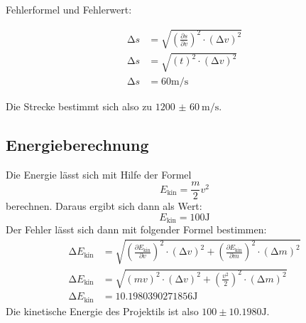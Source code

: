 Fehlerformel und Fehlerwert:

\begin{align*}
    \increment s &= \sqrt{\left(\frac{\partial s}{\partial v }\right)^2 \cdot \left(\increment v \right)^2 }\\
    \increment s &= \sqrt{\left(t\right)^2 \cdot \left(\increment v \right)^2 }\\
    \increment s &= 60 \si{\metre\per\second}
\end{align*}

Die Strecke bestimmt sich also zu $\SI{1200(60)}{\metre\per\second}$.

\subsection{Energieberechnung}

Die Energie lässt sich mit Hilfe der Formel
\begin{equation*}
    E_\text{kin}=\frac{m}{2}v^2
\end{equation*}
berechnen.
Daraus ergibt sich dann als Wert:
\begin{equation*}
    E_\text{kin}=100 \si{\joule}
\end{equation*}
\newline
Der Fehler lässt sich dann mit folgender Formel bestimmen:
\begin{align*}
    \increment E_\text{kin} &=\sqrt{
        \left(\frac{\partial E_\text{kin}}{\partial v }\right)^2 \cdot \left(\increment v \right)^2 +
        \left(\frac{\partial E_\text{kin}}{\partial m }\right)^2 \cdot \left(\increment m \right)^2 
        }\\
    \increment E_\text{kin} &=\sqrt{
        \left( mv \right)^2 \cdot \left(\increment v \right)^2 +
        \left(\frac{v^2}{2}\right)^2 \cdot \left(\increment m \right)^2 
        }\\
    \increment E_\text{kin} &= 10.1980390271856 \si{\joule}
\end{align*}
Die kinetische Energie des Projektils ist also $100 \pm 10.1980\si{\joule}$.





